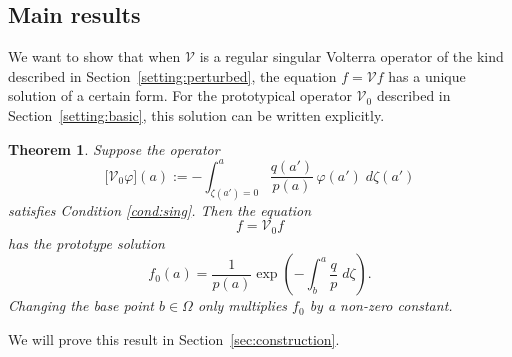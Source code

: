 \documentclass{article}
\theoremstyle{definition}
\theoremstyle{plain}
\newtheorem{theorem}{Theorem}
\newcommand{\volterra}{\mathcal{V}}
\newcommand{\hardpart}{\mathcal{V}_0}
\newcommand{\solproto}{f_0}
\newcommand{\domain}{\Omega}
\newenvironment{revtwo}{\color{revred}}{\color{black}}
\newenvironment{revtwo}{}{}
\begin{document}
\subsection{Main results}\label{sec:results}
We want to show that when $\volterra$ is a regular singular Volterra operator of the kind described in Section~\ref{setting:perturbed}, the equation $f = \volterra f$ has a unique solution of a certain form. For the prototypical operator $\hardpart$ described in Section~\ref{setting:basic}, this solution can be written explicitly.
\begin{theorem}\label{thm:basic_volterra}
\begin{revtwo}Suppose the operator%
\[ \big[\hardpart \varphi\big](a) := - \int_{\zeta(a')=0}^{a} \frac{q(a')}{p(a)}\,\varphi(a')\;d\zeta(a') \]
\end{revtwo}
satisfies {\em Condition \eqref{cond:sing}}. Then the equation
\begin{equation}\label{eq:hardpart}
f = \hardpart f    
\end{equation}
has the {\em prototype solution}
\begin{equation}\label{eqn:test_solution}
\solproto(a) = \frac{1}{p(a)} \exp\left(-\int_{b}^{a}\frac{q}{p}\;d\zeta\right).
\end{equation}
Changing the base point $b \in \domain$ only multiplies $f_0$ by a non-zero constant.
\end{theorem}
We will prove this result in Section~\ref{sec:construction}.
\end{document}
